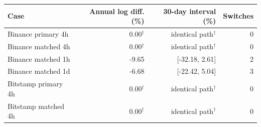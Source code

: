 \begin{tabular}{lrrr}\toprule Case & Annual log diff. (\%) & 30-day interval (\%) & Switches\\\midrule
Binance primary 4h & 0.00$^\dagger$ & identical path$^\dagger$ & 0\\
Binance matched 4h & 0.00$^\dagger$ & identical path$^\dagger$ & 0\\
Binance matched 1h & -9.65 & [-32.18, 2.61] & 2\\
Binance matched 1d & -6.68 & [-22.42, 5.04] & 3\\
Bitstamp primary 4h & 0.00$^\dagger$ & identical path$^\dagger$ & 0\\
Bitstamp matched 4h & 0.00$^\dagger$ & identical path$^\dagger$ & 0\\
\bottomrule\end{tabular}
